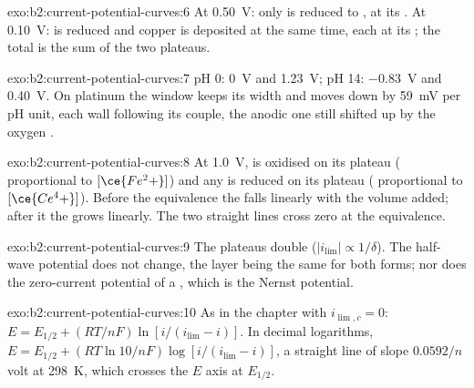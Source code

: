 \begin{solution}{exo:b2:current-potential-curves:6}
At \qty{0.50}{V}: only  is reduced to , at its .
At \qty{0.10}{V}:  is reduced and copper is deposited at the same time,
each at its ; the total is the sum of the two plateaus.
\end{solution}

\begin{solution}{exo:b2:current-potential-curves:7}
pH 0: \qty{0}{V} and \qty{1.23}{V}; pH 14: \qty{-0.83}{V} and \qty{0.40}{V}. On
platinum the window keeps its width and moves down by \qty{59}{mV} per pH unit,
each wall following its couple, the anodic one still shifted up by the oxygen
.
\end{solution}

\begin{solution}{exo:b2:current-potential-curves:8}
At \qty{1.0}{V},  is oxidised on its plateau (
proportional to $[\ce{Fe^2+}]$) and any  is reduced on its plateau
( proportional to $[\ce{Ce^4+}]$). Before the equivalence the
 falls linearly with the volume added; after it the  grows linearly. The two straight lines cross zero at the equivalence.
\end{solution}

\begin{solution}{exo:b2:current-potential-curves:9}
The plateaus double ($|i_{\lim}| \propto 1/\delta$). The half-wave potential does
not change, the layer being the same for both forms; nor does the zero-current
potential of a , which is the Nernst potential.
\end{solution}

\begin{solution}{exo:b2:current-potential-curves:10}
As in the chapter with $i_{\lim,c} = 0$: $E = E_{1/2} + (RT/nF)\ln[i/(i_{\lim} -
i)]$. In decimal logarithms, $E = E_{1/2} + (RT\ln 10/nF)\log[i/(i_{\lim} - i)]$,
a straight line of slope $0.0592/n$ volt at \qty{298}{K}, which crosses the
$E$ axis at $E_{1/2}$.
\end{solution}

